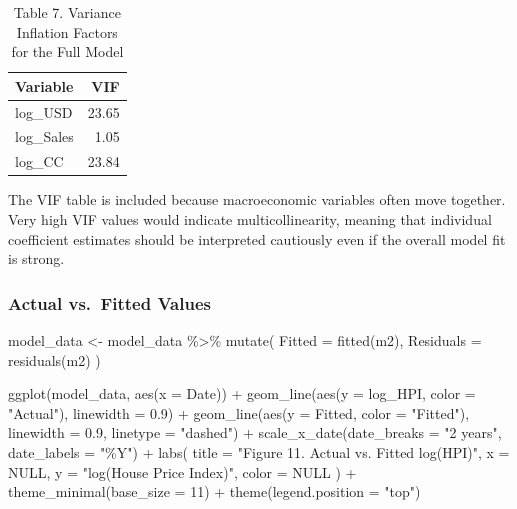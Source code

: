 \documentclass[
  11pt,
  a4paper,
  DIV=11,
  numbers=noendperiod]{scrartcl}
\newenvironment{Shaded}{\begin{snugshade}}{\end{snugshade}}
\newcommand{\AttributeTok}[1]{\textcolor[rgb]{0.40,0.45,0.13}{#1}}
\newcommand{\ConstantTok}[1]{\textcolor[rgb]{0.56,0.35,0.01}{#1}}
\newcommand{\DecValTok}[1]{\textcolor[rgb]{0.68,0.00,0.00}{#1}}
\newcommand{\FloatTok}[1]{\textcolor[rgb]{0.68,0.00,0.00}{#1}}
\newcommand{\FunctionTok}[1]{\textcolor[rgb]{0.28,0.35,0.67}{#1}}
\newcommand{\NormalTok}[1]{\textcolor[rgb]{0.00,0.23,0.31}{#1}}
\newcommand{\OtherTok}[1]{\textcolor[rgb]{0.00,0.23,0.31}{#1}}
\newcommand{\SpecialCharTok}[1]{\textcolor[rgb]{0.37,0.37,0.37}{#1}}
\newcommand{\StringTok}[1]{\textcolor[rgb]{0.13,0.47,0.30}{#1}}
\begin{document}
\begin{longtable}[t]{lr}
\caption{\label{tab:vif-check}Table 7. Variance Inflation Factors for the Full Model}\\
\toprule
Variable & VIF\\
\midrule
log\_USD & 23.65\\
log\_Sales & 1.05\\
log\_CC & 23.84\\
\bottomrule
\end{longtable}

The VIF table is included because macroeconomic variables often move
together. Very high VIF values would indicate multicollinearity, meaning
that individual coefficient estimates should be interpreted cautiously
even if the overall model fit is strong.

\subsubsection{Actual vs.~Fitted Values}\label{actual-vs.-fitted-values}

\begin{Shaded}
\begin{Highlighting}[]
\NormalTok{model\_data }\OtherTok{\textless{}{-}}\NormalTok{ model\_data }\SpecialCharTok{\%\textgreater{}\%}
  \FunctionTok{mutate}\NormalTok{(}
    \AttributeTok{Fitted =} \FunctionTok{fitted}\NormalTok{(m2),}
    \AttributeTok{Residuals =} \FunctionTok{residuals}\NormalTok{(m2)}
\NormalTok{  )}

\FunctionTok{ggplot}\NormalTok{(model\_data, }\FunctionTok{aes}\NormalTok{(}\AttributeTok{x =}\NormalTok{ Date)) }\SpecialCharTok{+}
  \FunctionTok{geom\_line}\NormalTok{(}\FunctionTok{aes}\NormalTok{(}\AttributeTok{y =}\NormalTok{ log\_HPI, }\AttributeTok{color =} \StringTok{"Actual"}\NormalTok{), }\AttributeTok{linewidth =} \FloatTok{0.9}\NormalTok{) }\SpecialCharTok{+}
  \FunctionTok{geom\_line}\NormalTok{(}\FunctionTok{aes}\NormalTok{(}\AttributeTok{y =}\NormalTok{ Fitted, }\AttributeTok{color =} \StringTok{"Fitted"}\NormalTok{), }\AttributeTok{linewidth =} \FloatTok{0.9}\NormalTok{, }\AttributeTok{linetype =} \StringTok{"dashed"}\NormalTok{) }\SpecialCharTok{+}
  \FunctionTok{scale\_x\_date}\NormalTok{(}\AttributeTok{date\_breaks =} \StringTok{"2 years"}\NormalTok{, }\AttributeTok{date\_labels =} \StringTok{"\%Y"}\NormalTok{) }\SpecialCharTok{+}
  \FunctionTok{labs}\NormalTok{(}
    \AttributeTok{title =} \StringTok{"Figure 11. Actual vs. Fitted log(HPI)"}\NormalTok{,}
    \AttributeTok{x =} \ConstantTok{NULL}\NormalTok{,}
    \AttributeTok{y =} \StringTok{"log(House Price Index)"}\NormalTok{,}
    \AttributeTok{color =} \ConstantTok{NULL}
\NormalTok{  ) }\SpecialCharTok{+}
  \FunctionTok{theme\_minimal}\NormalTok{(}\AttributeTok{base\_size =} \DecValTok{11}\NormalTok{) }\SpecialCharTok{+}
  \FunctionTok{theme}\NormalTok{(}\AttributeTok{legend.position =} \StringTok{"top"}\NormalTok{)}
\end{Highlighting}
\end{Shaded}
\end{document}
